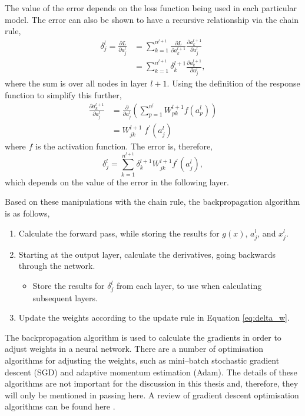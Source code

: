 The value of the error depends on the loss function being used in each 
particular model. The error can also be shown to have a recursive relationship 
via the chain rule,
\begin{align*}
		\delta^l_j = \frac{\partial L}{\partial a^l_j} &= \sum_{k=1}^{n^{l+1}} 
		\frac{\partial L}{\partial a^{l+1}_{k}}\frac{\partial a^{l+1}_k}{\partial 
		a^l_j}\\ 
		&= \sum^{n^{l+1}}_{k = 1} \delta^{l+1}_k \frac{\partial a^{l+1}_k}{\partial 
		a^l_j},
\end{align*}
where the sum is over all nodes in layer $l+1$. Using the definition of the 
response function to simplify this further,
\begin{align*}
		\frac{\partial a^{l+1}_k}{\partial a^l_j} &= \frac{\partial}{\partial a^l_j} 
		\left( \sum^{n^l}_{p=1} W^{l+1}_{pk} f(a^l_p) \right) \\ 
		&= W^{l+1}_{jk} \; f^\prime(a^l_j)
\end{align*}
where $f$ is the activation function. The error is, therefore,
\begin{equation*}
	\delta^l_j = \sum^{n^{l+1}}_{k=1} \delta^{l+1}_k W^{l+1}_{jk} f^\prime(a^l_j),
\end{equation*}
which depends on the value of the error in the following layer.

Based on these manipulations with the chain rule, the backpropagation 
algorithm is as follows,
\begin{enumerate}
	\item Calculate the forward pass, while storing the results for $g(x)$, 
		$a^l_j$, and $x^l_j$.
	\item Starting at the output layer, calculate the derivatives, going backwards
		through the network. 
	\begin{itemize}
		\item Store the results for $\delta^l_j$ from each layer, to use when 
			calculating subsequent layers.
	\end{itemize}
	\item Update the weights according to the update rule in Equation 
		\ref{eq:delta_w}.
\end{enumerate}

The backpropagation algorithm is used to calculate the gradients in order to
adjust weights in a neural network. There are a number of optimisation 
algorithms for adjusting the weights, such as mini--batch stochastic gradient 
descent (SGD)\cite{10.1145/2623330.2623612} and adaptive momentum estimation 
(Adam)\cite{KingmaD.P.2015AAMf}. The details of these algorithms are not 
important for the discussion in this thesis and, therefore, they will only be 
mentioned in passing here. A review of gradient descent optimisation 
algorithms can be found here \cite{ruder2016overview}. 

